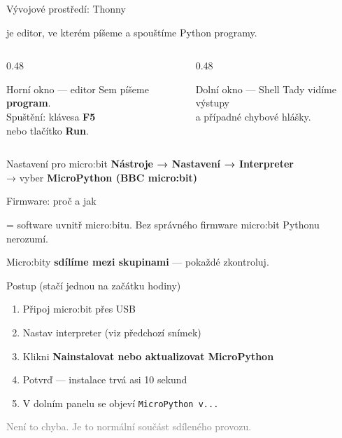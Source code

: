 \begin{frame}{Vývojové prostředí: Thonny}

   je editor, ve kterém píšeme a spouštíme Python programy.

  \bigskip
  \begin{columns}[T]
    \begin{column}{0.48\textwidth}
      \begin{block}{Horní okno — editor}
        Sem píšeme \textbf{program}.\\[4pt]
        Spuštění: klávesa \textbf{F5}\\
        nebo tlačítko \textbf{Run}.
      \end{block}
    \end{column}
    \begin{column}{0.48\textwidth}
      \begin{block}{Dolní okno — Shell}
        Tady vidíme výstupy\\
        a případné chybové hlášky.
      \end{block}
    \end{column}
  \end{columns}

  \bigskip
  \begin{block}{Nastavení pro micro:bit}
    \textbf{Nástroje → Nastavení → Interpreter}\\
    → vyber \textbf{MicroPython (BBC micro:bit)}
  \end{block}
\end{frame}

\begin{frame}{Firmware: proč a jak}

   = software uvnitř micro:bitu.
  Bez správného firmware micro:bit Pythonu nerozumí.

  \bigskip
  Micro:bity \textbf{sdílíme mezi skupinami} — pokaždé zkontroluj.

  \medskip
  \begin{block}{Postup (stačí jednou na začátku hodiny)}
    \begin{enumerate}
      \item Připoj micro:bit přes USB
      \item Nastav interpreter (viz předchozí snímek)
      \item Klikni \textbf{Nainstalovat nebo aktualizovat MicroPython}
      \item Potvrď — instalace trvá asi 10 sekund
      \item V dolním panelu se objeví \texttt{MicroPython v...}
    \end{enumerate}
  \end{block}

  \smallskip
  \textcolor{gray}{\small Není to chyba. Je to normální součást sdíleného provozu.}
\end{frame}


